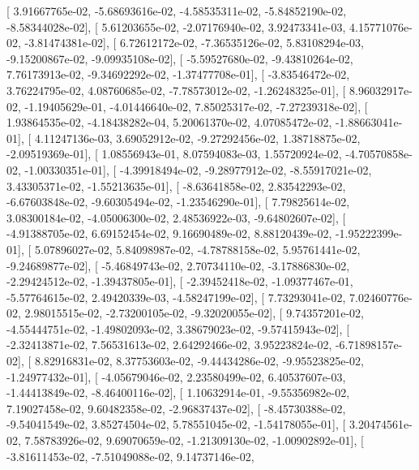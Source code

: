 \documentclass{article}
\begin{document}
       [  3.91667765e-02,  -5.68693616e-02,  -4.58535311e-02,
         -5.84852190e-02,  -8.58344028e-02],
       [  5.61203655e-02,  -2.07176940e-02,   3.92473341e-03,
          4.15771076e-02,  -3.81474381e-02],
       [  6.72612172e-02,  -7.36535126e-02,   5.83108294e-03,
         -9.15200867e-02,  -9.09935108e-02],
       [ -5.59527680e-02,  -9.43810264e-02,   7.76173913e-02,
         -9.34692292e-02,  -1.37477708e-01],
       [ -3.83546472e-02,   3.76224795e-02,   4.08760685e-02,
         -7.78573012e-02,  -1.26248325e-01],
       [  8.96032917e-02,  -1.19405629e-01,  -4.01446640e-02,
          7.85025317e-02,  -7.27239318e-02],
       [  1.93864535e-02,  -4.18438282e-04,   5.20061370e-02,
          4.07085472e-02,  -1.88663041e-01],
       [  4.11247136e-03,   3.69052912e-02,  -9.27292456e-02,
          1.38718875e-02,  -2.09519369e-01],
       [  1.08556943e-01,   8.07594083e-03,   1.55720924e-02,
         -4.70570858e-02,  -1.00330351e-01],
       [ -4.39918494e-02,  -9.28977912e-02,  -8.55917021e-02,
          3.43305371e-02,  -1.55213635e-01],
       [ -8.63641858e-02,   2.83542293e-02,  -6.67603848e-02,
         -9.60305494e-02,  -1.23546290e-01],
       [  7.79825614e-02,   3.08300184e-02,  -4.05006300e-02,
          2.48536922e-03,  -9.64802607e-02],
       [ -4.91388705e-02,   6.69152454e-02,   9.16690489e-02,
          8.88120439e-02,  -1.95222399e-01],
       [  5.07896027e-02,   5.84098987e-02,  -4.78788158e-02,
          5.95761441e-02,  -9.24689877e-02],
       [ -5.46849743e-02,   2.70734110e-02,  -3.17886830e-02,
         -2.29424512e-02,  -1.39437805e-01],
       [ -2.39452418e-02,  -1.09377467e-01,  -5.57764615e-02,
          2.49420339e-03,  -4.58247199e-02],
       [  7.73293041e-02,   7.02460776e-02,   2.98015515e-02,
         -2.73200105e-02,  -9.32020055e-02],
       [  9.74357201e-02,  -4.55444751e-02,  -1.49802093e-02,
          3.38679023e-02,  -9.57415943e-02],
       [ -2.32413871e-02,   7.56531613e-02,   2.64292466e-02,
          3.95223824e-02,  -6.71898157e-02],
       [  8.82916831e-02,   8.37753603e-02,  -9.44434286e-02,
         -9.95523825e-02,  -1.24977432e-01],
       [ -4.05679046e-02,   2.23580499e-02,   6.40537607e-03,
         -1.44413849e-02,  -8.46400116e-02],
       [  1.10632914e-01,  -9.55356982e-02,   7.19027458e-02,
          9.60482358e-02,  -2.96837437e-02],
       [ -8.45730388e-02,  -9.54041549e-02,   3.85274504e-02,
          5.78551045e-02,  -1.54178055e-01],
       [  3.20474561e-02,   7.58783926e-02,   9.69070659e-02,
         -1.21309130e-02,  -1.00902892e-01],
       [ -3.81611453e-02,  -7.51049088e-02,   9.14737146e-02,
\end{document}
